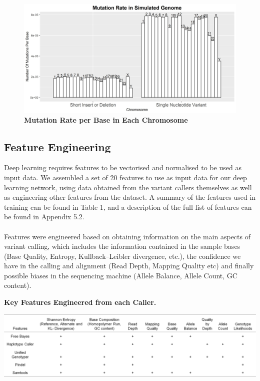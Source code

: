 \documentclass{article}
\begin{document}
\begin{figure}[H]
\centering
\includegraphics[width=\textwidth]{MutationRateInSimulatedGenome.jpg}
\caption{\textbf{Mutation Rate per Base in Each Chromosome}}
\end{figure}

\subsection{Feature Engineering}
Deep learning requires features to be vectorised and normalised to be used as input data. We assembled a set of 20 features to use as input data for our deep learning network, using data obtained from the variant callers themselves as well as engineering other features from the dataset. A summary of the features used in training can be found in Table 1, and a description of the full list of features can be found in Appendix 5.2.\\\\
Features were engineered based on obtaining information on the main aspects of variant calling, which includes the information contained in the sample bases (Base Quality, Entropy, Kullback–Leibler divergence, etc.), the confidence we have in the calling and alignment (Read Depth, Mapping Quality etc) and finally possible biases in the sequencing machine (Allele Balance, Allele Count, GC content).

\begin{table}[H]
\caption{\textbf{Key Features Engineered from each Caller.}}
\includegraphics[width=\textwidth]{featureengineering.png}
\centering
\end{table}
\end{document}
